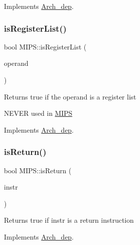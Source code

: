 Implements \hyperlink{classArch__dep_aa96008928838f1ff0f96ba83b07b90e2}{Arch\+\_\+dep}.

\mbox{\label{classMIPS_aa1efaf59e1d461388886db68f5e54e06}} 
\subsubsection{\texorpdfstring{is\+Register\+List()}{isRegisterList()}}
{\footnotesize\ttfamily bool M\+I\+P\+S\+::is\+Register\+List (\begin{DoxyParamCaption}\item[{const string \&}]{operand }\end{DoxyParamCaption})\hspace{0.3cm}{\ttfamily [virtual]}}

Returns true if the operand is a register list

N\+E\+V\+ER used in \hyperlink{classMIPS}{M\+I\+PS} 

Implements \hyperlink{classArch__dep_a6c37096e67b2c02e9c0bd38313245979}{Arch\+\_\+dep}.

\mbox{\label{classMIPS_af2307adac1cb8289cb7510829051f45d}} 
\subsubsection{\texorpdfstring{is\+Return()}{isReturn()}}
{\footnotesize\ttfamily bool M\+I\+P\+S\+::is\+Return (\begin{DoxyParamCaption}\item[{const \hyperlink{classObjdumpInstruction}{Objdump\+Instruction} \&}]{instr }\end{DoxyParamCaption})\hspace{0.3cm}{\ttfamily [virtual]}}

Returns true if instr is a return instruction 

Implements \hyperlink{classArch__dep_a0f8a68b8dc2188a0578f3b4d92a289ca}{Arch\+\_\+dep}.

\mbox{\label{classMIPS_a9390579a78d85c1024dcde783bff27b7}} 
